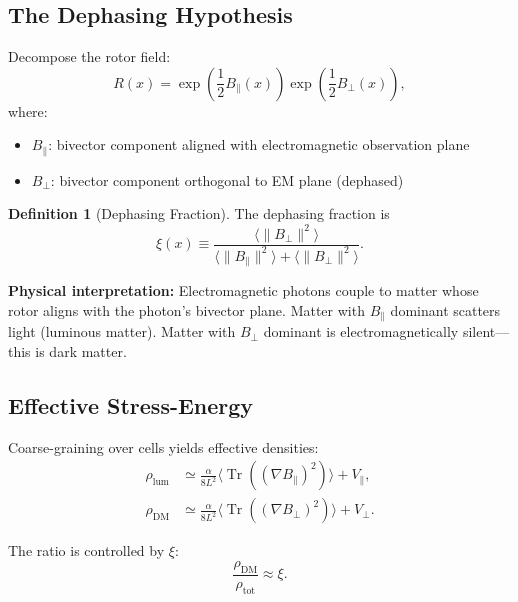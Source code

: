 \documentclass[11pt,a4paper]{article}
\numberwithin{equation}{section}
\theoremstyle{plain}
\theoremstyle{definition}
\newtheorem{definition}[theorem]{Definition}
\theoremstyle{remark}
\DeclareMathOperator{\Tr}{Tr}
\begin{document}
\subsection{The Dephasing Hypothesis}

Decompose the rotor field:
\begin{equation}
R(x) = \exp\left(\frac{1}{2}B_\parallel(x)\right)\exp\left(\frac{1}{2}B_\perp(x)\right),
\label{eq:dm-decomposition}
\end{equation}
where:
\begin{itemize}
\item $B_\parallel$: bivector component aligned with electromagnetic observation plane
\item $B_\perp$: bivector component orthogonal to EM plane (dephased)
\end{itemize}

\begin{definition}[Dephasing Fraction]
The dephasing fraction is
\begin{equation}
\xi(x) \equiv \frac{\langle \|B_\perp\|^2 \rangle}{\langle \|B_\parallel\|^2 \rangle + \langle \|B_\perp\|^2 \rangle}.
\label{eq:dephasing-fraction}
\end{equation}
\end{definition}

\textbf{Physical interpretation:} Electromagnetic photons couple to matter whose rotor aligns with the photon's bivector plane. Matter with $B_\parallel$ dominant scatters light (luminous matter). Matter with $B_\perp$ dominant is electromagnetically silent—this is dark matter.

\subsection{Effective Stress-Energy}

Coarse-graining over cells yields effective densities:
\begin{align}
\rho_{\mathrm{lum}} &\simeq \frac{\alpha}{8L^2}\langle\Tr((\nabla B_\parallel)^2)\rangle + V_\parallel,\\
\rho_{\mathrm{DM}} &\simeq \frac{\alpha}{8L^2}\langle\Tr((\nabla B_\perp)^2)\rangle + V_\perp.
\end{align}

The ratio is controlled by $\xi$:
\begin{equation}
\frac{\rho_{\mathrm{DM}}}{\rho_{\mathrm{tot}}} \approx \xi.
\end{equation}
\end{document}
